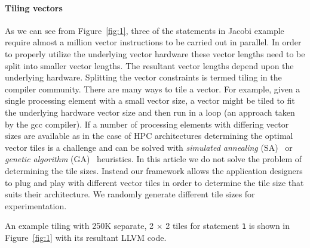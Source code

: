\paragraph{\textbf{Tiling vectors}}
\label{sec:tiling-vector-counts}

As we can see from Figure~\ref{fig:1}, three of the statements in Jacobi
example require almost a million vector instructions to be carried out
in parallel. %
In order to properly utilize the underlying vector hardware these vector
lengths need to be split into smaller vector lengths. The resultant
vector lengths depend upon the underlying hardware. Splitting the vector
constraints is termed tiling in the compiler community. There are many
ways to tile a vector. For example, given a single processing element
with a small vector size, a vector might be tiled to fit the underlying
hardware vector size and then run in a loop (an approach taken by the
gcc compiler). If a number of processing elements with differing vector
sizes are available as in the case of HPC architectures determining the
optimal vector tiles is a challenge and can be solved with
\textit{simulated annealing} (SA)~\cite{tbra01} or \textit{genetic
  algorithm} (GA)~\cite{tbra01} heuristics. In this article we do not
solve the problem of determining the tile sizes. Instead our framework
allows the application designers to plug and play with different vector
tiles in order to determine the tile size that suits their
architecture. We randomly generate different tile sizes for
experimentation.

An example tiling with 250K separate, 2 $\times$ 2 tiles for statement
\texttt{1} is shown in Figure~\ref{fig:1} with its resultant LLVM
code. %



